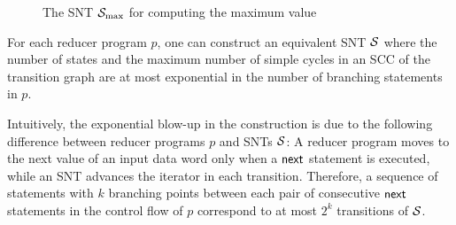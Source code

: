 \begin{example}
\begin{figure}[htbp]
\begin{center}
\caption{The SNT ${\mathcal{S} }_{\max}$ for computing the maximum value}
\label{fig-snt-exmp}
\end{center}
\end{figure}
\end{example}



\begin{proposition}\label{prop-mrprog-to-snt}
For each reducer program $p$, one can construct an equivalent SNT ${\mathcal{S} }$ where the number of states and the maximum number of simple cycles in an SCC of the transition graph are at most exponential in the number of branching statements in $p$. 
\end{proposition}
Intuitively, the exponential blow-up in the construction is due to the following difference between reducer programs $p$ and SNTs ${\mathcal{S} }$: A reducer program moves to the next value of an input data word only when a $\mathsf{next}$ statement is executed, while an SNT advances the iterator in each transition. Therefore, a sequence of statements with $k$ branching points between each pair of consecutive $\mathsf{next}$ statements in the control flow of $p$ correspond to at most $2^k$ transitions of ${\mathcal{S} }$.



%
%
%

